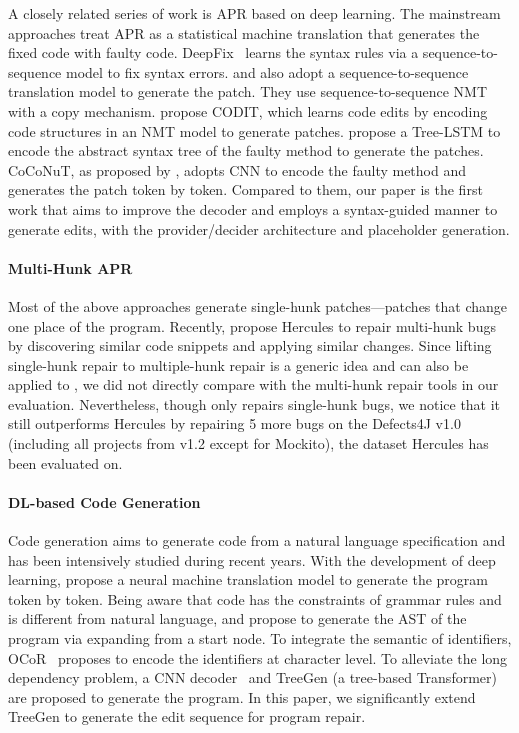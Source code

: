 A closely related series of work is APR based on deep learning. The mainstream approaches treat APR as a statistical machine translation that generates the fixed code with faulty code. DeepFix~\cite{10.5555/3298239.3298436} learns the syntax rules via a sequence-to-sequence model to fix syntax errors. \citet{6606623} and \citet{9000077} also adopt a sequence-to-sequence translation model to generate the patch. They use sequence-to-sequence NMT with a copy mechanism. \citet{codit} propose CODIT, which learns code edits by encoding code structures in an NMT model to generate patches. \citet{dlfix} propose a Tree-LSTM to encode the abstract syntax tree of the faulty method to generate the patches. CoCoNuT, as proposed by \citet{coconut}, adopts CNN to encode the faulty method and generates the patch token by token. Compared to them, our paper is the first work that aims to improve the decoder and employs a syntax-guided manner to generate edits, with the provider/decider architecture and placeholder generation. 

\paragraph{\textbf {Multi-Hunk APR}} Most of the above approaches generate single-hunk patches---patches that change one place of the program. Recently, \citet{saha2019harnessing} propose Hercules to repair multi-hunk bugs by discovering similar code snippets and applying similar changes. Since lifting single-hunk repair to multiple-hunk repair is a generic idea and can also be applied to \techname, we did not directly compare \techname with the multi-hunk repair tools in our evaluation. Nevertheless, though \techname only repairs single-hunk bugs, we notice that it still outperforms Hercules by repairing 5 more bugs on the Defects4J v1.0 (including all projects from v1.2 except for Mockito), the dataset Hercules has been evaluated on.

\paragraph{\textbf{DL-based Code Generation}} Code generation aims to generate code from a natural language specification and has been intensively studied during recent years. With the development of deep learning, \citet{ling2016latent} propose a neural machine translation model to generate the program token by token. Being aware that code has the constraints of grammar rules and is different from natural language, \citet{DBLP:conf/acl/YinN17} and \citet{DBLP:conf/acl/RabinovichSK17} propose to generate the AST of the program via expanding from a start node. To integrate the semantic of identifiers, OCoR~\cite{ocor} proposes to encode the identifiers at character level. To alleviate the long dependency problem, a CNN decoder~\cite{DBLP:conf/aaai/SunZMXLZ19} and TreeGen (a tree-based Transformer)~\cite{treegen} are proposed to generate the program. In this paper, we significantly extend TreeGen to generate the edit sequence for program repair.

